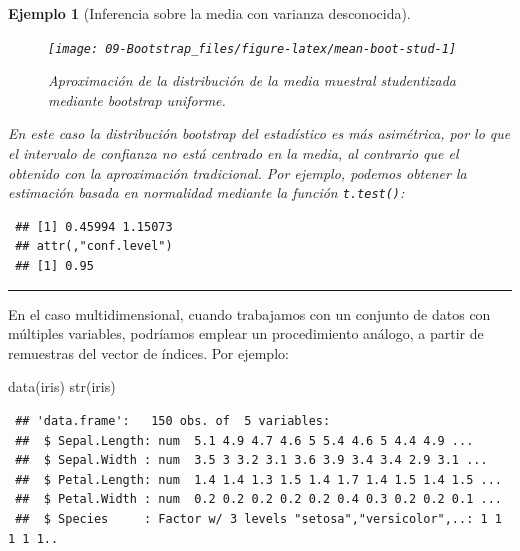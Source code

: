 \documentclass[
  10pt,
]{book}
\newenvironment{Shaded}{\begin{snugshade}}{\end{snugshade}}
\newcommand{\FunctionTok}[1]{\textcolor[rgb]{0.00,0.00,0.00}{#1}}
\newcommand{\NormalTok}[1]{#1}
\newcommand{\SpecialCharTok}[1]{\textcolor[rgb]{0.00,0.00,0.00}{#1}}
\theoremstyle{break}
\newtheorem{example}{Ejemplo}[chapter]
\theoremstyle{nonumberplain}
\begin{document}
\begin{example}[Inferencia sobre la media con varianza desconocida]
\begin{figure}[!htbp]

{\centering \texttt{[image: 09-Bootstrap\_files/figure-latex/mean-boot-stud-1]} 

}

\caption{Aproximación de la distribución de la media muestral studentizada mediante bootstrap uniforme.}\label{fig:mean-boot-stud}
\end{figure}

En este caso la distribución bootstrap del estadístico es más asimétrica, por lo que el intervalo de confianza no está centrado en la media,
al contrario que el obtenido con la aproximación tradicional.
Por ejemplo, podemos obtener la estimación basada en normalidad mediante la función \texttt{t.test()}:

\begin{Shaded}
\end{Shaded}

\begin{verbatim}
 ## [1] 0.45994 1.15073
 ## attr(,"conf.level")
 ## [1] 0.95
\end{verbatim}

\end{example}

\begin{center}\rule{0.5\linewidth}{0.5pt}\end{center}

En el caso multidimensional, cuando trabajamos con un conjunto de datos con múltiples variables, podríamos emplear un procedimiento análogo, a partir de remuestras del vector de índices.
Por ejemplo:

\begin{Shaded}
\begin{Highlighting}[]
\FunctionTok{data}\NormalTok{(iris)}
\FunctionTok{str}\NormalTok{(iris)}
\end{Highlighting}
\end{Shaded}

\begin{verbatim}
 ## 'data.frame':   150 obs. of  5 variables:
 ##  $ Sepal.Length: num  5.1 4.9 4.7 4.6 5 5.4 4.6 5 4.4 4.9 ...
 ##  $ Sepal.Width : num  3.5 3 3.2 3.1 3.6 3.9 3.4 3.4 2.9 3.1 ...
 ##  $ Petal.Length: num  1.4 1.4 1.3 1.5 1.4 1.7 1.4 1.5 1.4 1.5 ...
 ##  $ Petal.Width : num  0.2 0.2 0.2 0.2 0.2 0.4 0.3 0.2 0.2 0.1 ...
 ##  $ Species     : Factor w/ 3 levels "setosa","versicolor",..: 1 1 1 1 1..
\end{verbatim}
\end{document}
